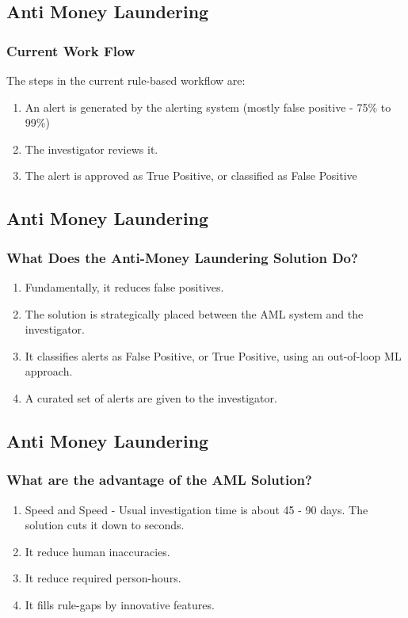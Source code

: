 \documentclass[11pt,
               aspectratio=169,
               hyperref={colorlinks}
               ]{beamer}
\begin{document}
		\subsection{Anti Money Laundering}
	\begin{frame}
		\frametitle{Current Work Flow}
		The steps in the current rule-based workflow are:\\
		\begin{enumerate}
			\item An alert is generated by the alerting system (mostly false positive - 75\% to 99\%)
			\item The investigator reviews it.
			\item The alert is approved as True Positive, or classified as False Positive
		\end{enumerate}
	\end{frame}

		\subsection{Anti Money Laundering}
	\begin{frame}
		\frametitle{What Does the Anti-Money Laundering Solution Do?}
		
		\begin{enumerate}
			\item Fundamentally, it reduces false positives.
			\item The solution is strategically placed between the AML system and the investigator. 
			\item It classifies alerts as False Positive, or True Positive, using an out-of-loop ML approach.
			\item A curated set of alerts are given to the investigator. 
		\end{enumerate}
	\end{frame}

		\subsection{Anti Money Laundering}
	\begin{frame}
		\frametitle{What are the advantage of the AML Solution?}
		
		\begin{enumerate}
			\item Speed and Speed - Usual investigation time is about 45 - 90 days. The solution cuts it down to seconds. 
			\item It reduce human inaccuracies. 
			\item It reduce required person-hours. 
			\item It fills rule-gaps by innovative features. 
		\end{enumerate}
	\end{frame}
\end{document}
